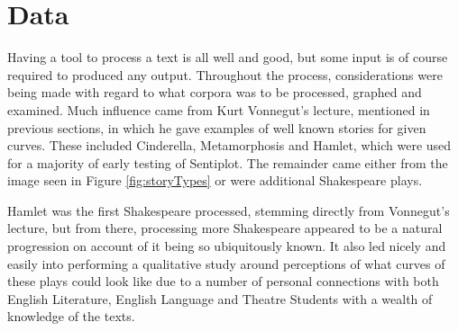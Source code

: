 \documentclass{article}
\begin{document}
{\section{Data}
    Having a tool to process a text is all well and good, but some input is of course required to produced any output. Throughout the process, considerations were being made with regard to what corpora was to be processed, graphed and examined. Much influence came from Kurt Vonnegut's lecture, mentioned in previous sections, in which he gave examples of well known stories for given curves. These included Cinderella, Metamorphosis and Hamlet, which were used for a majority of early testing of Sentiplot. The remainder came either from the image seen in Figure \ref{fig:storyTypes} or were additional Shakespeare plays.

    Hamlet was the first Shakespeare processed, stemming directly from Vonnegut's lecture, but from there, processing more Shakespeare appeared to be a natural progression on account of it being so ubiquitously known. It also led nicely and easily into performing a qualitative study around perceptions of what curves of these plays could look like due to a number of personal connections with both English Literature, English Language and Theatre Students with a wealth of knowledge of the texts.
    
}
\end{document}
